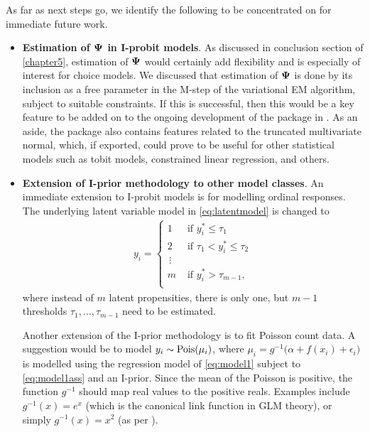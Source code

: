 \documentclass[a4paper,showframe,11pt]{report}
\begin{document}
As far as next steps go, we identify the following to be concentrated on for immediate future work.
\begin{itemize}
  \item \textbf{Estimation of ${\bm\Psi}$ in I-probit models}.
  As discussed in conclusion section of \cref{chapter5}, estimation of ${\bm\Psi}$ would certainly add flexibility and is especially of interest for choice models.
  We discussed that estimation of ${\bm\Psi}$ is done by its inclusion as a free parameter in the M-step of the variational EM algorithm, subject to suitable constraints.
  If this is successful, then this would be a key feature to be added on to the ongoing development of the  package in .
  As an aside, the package also contains features related to the truncated multivariate normal, which, if exported, could prove to be useful for other statistical models such as tobit models, constrained linear regression, and others.
  
  \item \textbf{Extension of I-prior methodology to other model classes}.
  An immediate extension to I-probit models is for modelling ordinal responses.
  The underlying latent variable model in \cref{eq:latentmodel} is changed to
  \begin{align}\label{eq:latentmodel2}
    y_i =
    \begin{cases}
      1 &\text{ if } y_i^* \leq \tau_1 \\
      2 &\text{ if } \tau_1 < y_i^* \leq \tau_2 \\
      \,\vdots \\
      m &\text{ if } y_i^* > \tau_{m-1}, \\
    \end{cases}  
  \end{align}
  where instead of $m$ latent propensities, there is only one, but $m-1$ thresholds $\tau_1,\dots,\tau_{m-1}$ need to be estimated.
  
  Another extension of the I-prior methodology is to fit Poisson count data.
  A suggestion would be to model $y_i\sim\operatorname{Pois}(\mu_i)$, where $\mu_i = g^{-1}\big( \alpha + f(x_i) + \epsilon_i \big)$ is modelled using the  regression model of \cref{eq:model1} subject to \cref{eq:model1ass} and an I-prior.
  Since the mean of the Poisson is positive, the function $g^{-1}$ should map real values to the positive reals.
  Examples include $g^{-1}(x)=e^x$ (which is the canonical link function in GLM theory), or simply $g^{-1}(x)=x^2$ (as per \cite{lloyd2015variational}).
  

\end{itemize}
\end{document}
